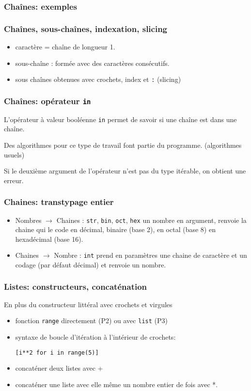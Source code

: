 \begin{frame}
  \frametitle{Chaînes: exemples}

\end{frame}

\begin{frame}
  \frametitle{Chaînes, sous-chaînes, indexation, slicing}
\begin{itemize}
  \item caractère = chaîne de longueur 1.
  \item sous-chaîne : formée avec des caractères consécutifs.
  \item sous chaînes obtenues avec crochets, index et \texttt{:} (slicing)
\end{itemize}

\end{frame}

\begin{frame}
  \frametitle{Chaînes: opérateur \texttt{in}}
  L'opérateur à valeur booléenne \texttt{in} permet de savoir si une chaîne est dans une chaîne.
  
  Des algorithmes pour ce type de travail font partie du programme. (algorithmes usuels)
  
  Si le deuxième argument de l'opérateur n'est pas du type itérable, on obtient une erreur.
\end{frame}

\begin{frame}
  \frametitle{Chaines: transtypage entier}
\begin{itemize}
  \item Nombres $\rightarrow$ Chaines : \texttt{str}, \texttt{bin}, \texttt{oct}, \texttt{hex} un nombre en argument, renvoie la chaine qui le code en décimal, binaire (base 2), en octal (base 8) en hexadécimal (base 16).

  \item Chaines $\rightarrow$ Nombre : \texttt{int} prend en paramètres une chaine de caractère et un codage (par défaut décimal) et renvoie un nombre. 
\end{itemize}
\end{frame}

\begin{frame}
  \frametitle{Listes: constructeurs, concaténation}
  En plus du constructeur littéral avec crochets et virgules
  \begin{itemize}
    \item fonction \texttt{range} directement (P2) ou avec \texttt{list} (P3)
    \item syntaxe de boucle d'itération à l'intérieur de crochets:
      \begin{center}
        \texttt{[i**2 for i in range(5)]}
      \end{center}
    \item concaténer deux listes avec +
    \item concaténer une liste avec elle même un nombre entier de fois avec *.
  \end{itemize}
\end{frame}

